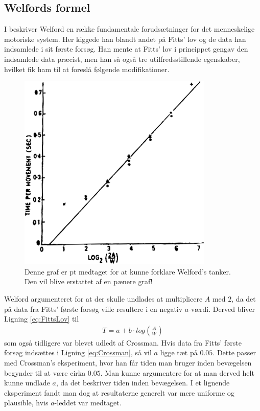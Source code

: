 \subsection*{Welfords formel}

I \cite{welford1968} beskriver Welford en række fundamentale forudsætninger for det menneskelige motoriske system. Her kiggede han blandt andet på Fitts' lov og de data han indsamlede i sit første forsøg. Han mente at Fitts' lov i princippet gengav den indsamlede data præcist, men han så også tre utilfredsstillende egenskaber, hvilket fik ham til at foreslå følgende modifikationer.
\begin{figure}[h]
\centering
\includegraphics{images/illustrations/welford_plot}
\caption{Denne graf er pt medtaget for at kunne forklare Welford's tanker. Den vil blive erstattet af en pænere graf!}
\label{fig:WelfordGraf}
\end{figure}
Welford argumenteret for at der skulle undlades at multiplicere $A$ med $2$, da det på data fra Fitts' første forsøg ville resultere i en negativ $a$-værdi. Derved bliver Ligning \ref{eq:FittsLov} til
\begin{align}
\label{eq:Crossman}
T = a + b \cdot log\left(\frac{A}{W}\right)
\end{align}
som også tidligere var blevet udledt af Crossman\cite{crossman1957}. Hvis data fra Fitts' første forsøg indsættes i Ligning \ref{eq:Crossman}, så vil $a$ ligge tæt på $0.05$. Dette passer med Crossman's eksperiment, hvor han får tiden man bruger inden bevægelsen begynder til at være cirka $0.05$\cite{crossman1957}. Man kunne argumentere for at man derved helt kunne undlade $a$, da det beskriver tiden inden bevægelsen. I et lignende eksperiment\cite{welford1958} fandt man dog at resultaterne generelt var mere uniforme og plausible, hvis $a$-leddet var medtaget.

